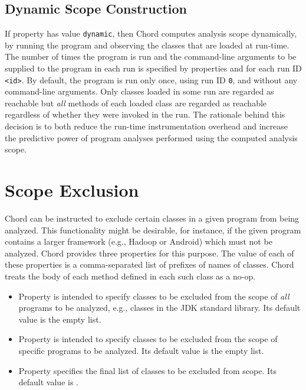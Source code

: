 \subsection{Dynamic Scope Construction}

If property  has value {\tt dynamic}, then Chord
computes analysis scope
dynamically, by running the program and observing the
classes that are loaded at run-time.  The number of times the program
is run and the command-line arguments to be supplied to the program in
each run is specified by properties  and
 for each run ID {\tt <id>}.  By default, the
program is run only once, using run ID {\tt 0}, and without any
command-line arguments.  Only classes loaded in some run are regarded
as reachable but {\it all} methods of each loaded class are regarded
as reachable regardless of whether they were invoked in the run.  The
rationale behind this decision is to both reduce the run-time instrumentation
overhead and increase the predictive power of program analyses
performed using the computed analysis scope.

\section{Scope Exclusion}
\label{sec:scope-exclude}

Chord can be instructed to exclude certain classes in a given program 
from being analyzed.
This functionality might be desirable, for instance, if the given program
contains a larger framework (e.g., Hadoop or Android) which
must not be analyzed.
Chord provides three properties for this purpose.
The value of each of these properties is a comma-separated list of prefixes
of names of classes.  Chord treats the body of each method defined in
each such class as a no-op.

\begin{itemize}
\item
Property  is intended to specify
classes to be excluded from the scope of {\it all} programs to be
analyzed, e.g., classes in the JDK standard library.  Its default
value is the empty list.
\item
Property  is intended to specify
classes to be excluded from the scope of specific programs to be
analyzed.  Its default value is the empty list.
\item
Property  specifies the final list of
classes to be excluded from scope.  Its default value is
.
\end{itemize}

